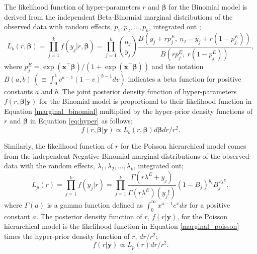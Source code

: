 \documentclass[article]{jss}
\begin{document}
The likelihood function of hyper-parameters $r$ and $\boldsymbol{\beta}$ for the Binomial  model is derived from the independent Beta-Binomial marginal distributions of the observed data with random effects, $p_1, p_2, \ldots, p_k$, integrated out \citep{skellam1948}; %
\begin{equation}\label{marginal_binomial}
L_b(r, \boldsymbol{\boldsymbol{\beta}})=\prod_{j=1}^k f(y_j\vert r, \boldsymbol{\boldsymbol{\beta}})=\prod_{j=1}^k\binom{n_j}{y_j}\frac{B(y_j+rp^E_j, ~n_j-y_j+r(1-p^E_j))}{B(rp^E_j, ~r(1-p^E_j))},
\end{equation}
where $p^E_j=\exp(\boldsymbol{x}^\top\boldsymbol{\beta})/(1+\exp(\boldsymbol{x}^\top\boldsymbol{\beta}))$ and the notation $B(a, b)~(\equiv\int_0^1 v^{a-1}(1-v)^{b-1}dv)$ indicates a beta function for positive constants $a$ and $b$. The joint posterior density  function of hyper-parameters $f(r, \boldsymbol{\boldsymbol{\beta}}\vert \boldsymbol{y})$ for the Binomial  model is proportional to their likelihood function in Equation \ref{marginal_binomial} multiplied by the hyper-prior density functions of $r$ and $\boldsymbol{\beta}$ in Equation \ref{eq:hyper} as follows;
\begin{equation}\label{marginal_post_binomial}
f(r, \boldsymbol{\boldsymbol{\beta}}\vert \boldsymbol{y})\propto L_b(r, \boldsymbol{\boldsymbol{\beta}})d\boldsymbol{\beta}dr/r^2.
\end{equation}


Similarly, the likelihood function of $r$ for the Poisson hierarchical model  comes from the independent Negative-Binomial marginal distributions of the observed data with the random effects, $\lambda_1, \lambda_2, \ldots, \lambda_k$, integrated out;
\begin{equation}\label{marginal_poisson}
L_p(r)=\prod_{j=1}^k f(y_j\vert r)=\prod^{k}_{j=1} \frac{\Gamma(r \lambda^E+y_j)}{\Gamma(r\lambda^E)(y_j!)}(1-B_{j})^{y_{i}}B_{j}^{r \lambda^E},
\end{equation}
where $\Gamma(a)$ is a gamma function defined as $\int_0^\infty x^{a-1}e^{x}dx$ for a positive constant $a$. The posterior density function of $r$, $f(r\vert \boldsymbol{y})$, for the Poisson hierarchical model is  the likelihood function in Equation \ref{marginal_poisson} times the hyper-prior density function of $r$, $dr/r^2$;
\begin{equation}\label{marginal_post_poisson}
f(r \vert \boldsymbol{y})\propto L_p(r)dr/r^2.
\end{equation}
\end{document}
